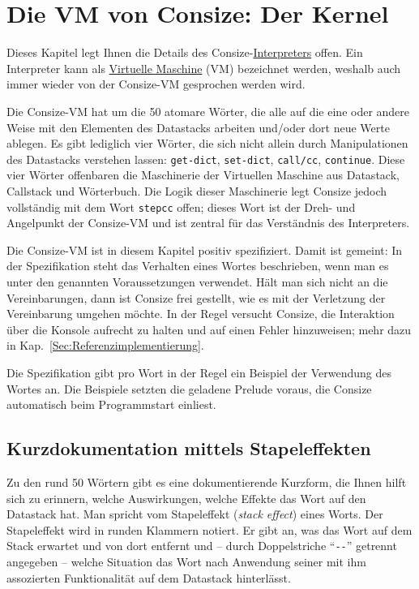 \chapter{Die VM von Consize: Der Kernel}
\label{Sec:ConsizeVM}

Dieses Kapitel legt Ihnen die Details des Consize-\href{http://de.wikipedia.org/wiki/Interpreter}{Interpreters} offen. Ein Interpreter kann als \href{http://de.wikipedia.org/wiki/Virtuelle_Maschine}{Virtuelle Maschine} (VM) bezeichnet werden, weshalb auch immer wieder von der Consize-VM gesprochen werden wird. 

Die Consize-VM hat um die 50 atomare Wörter, die alle auf die eine oder andere Weise mit den Elementen des Datastacks arbeiten und\slash oder dort neue Werte ablegen. Es gibt lediglich vier Wörter, die sich nicht allein durch Manipulationen des Datastacks verstehen lassen: \verb|get-dict|, \verb|set-dict|, \verb|call/cc|, \verb|continue|. Diese vier Wörter offenbaren die Maschinerie der Virtuellen Maschine aus Datastack, Callstack und Wörterbuch. Die Logik dieser Maschinerie legt Consize jedoch vollständig mit dem Wort \verb|stepcc| offen; dieses Wort ist der Dreh- und Angelpunkt der Consize-VM und ist zentral für das Verständnis des Interpreters.

Die Consize-VM ist in diesem Kapitel positiv spezifiziert. Damit ist gemeint: In der Spezifikation steht das Verhalten eines Wortes beschrieben, wenn man es unter den genannten Voraussetzungen verwendet. Hält man sich nicht an die Vereinbarungen, dann ist Consize frei gestellt, wie es mit der Verletzung der Vereinbarung umgehen möchte. In der Regel versucht Consize, die Interaktion über die Konsole aufrecht zu halten und auf einen Fehler hinzuweisen; mehr dazu in Kap.~\ref{Sec:Referenzimplementierung}.

Die Spezifikation gibt pro Wort in der Regel ein Beispiel der Verwendung des Wortes an. Die Beispiele setzten die geladene Prelude voraus, die Consize automatisch beim Programmstart einliest.

\section{Kurzdokumentation mittels Stapeleffekten}

Zu den rund 50 Wörtern gibt es eine dokumentierende Kurzform, die Ihnen hilft sich zu erinnern, welche Auswirkungen, welche Effekte das Wort auf den Datastack hat. Man spricht vom Stapeleffekt (\emph{stack effect}) eines Worts. Der Stapeleffekt wird in runden Klammern notiert. Er gibt an, was das Wort auf dem Stack erwartet und von dort entfernt und  -- durch Doppelstriche "`\verb|--|"' getrennt angegeben -- welche Situation das Wort nach Anwendung seiner mit ihm assozierten Funktionalität auf dem Datastack hinterlässt.

